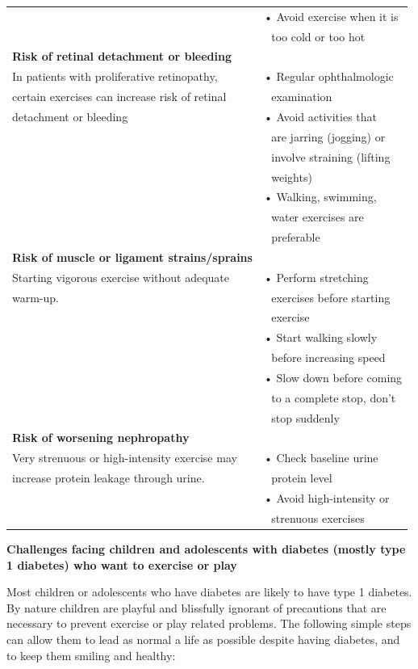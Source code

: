 {\begin{longtable}{|l|l|}
 & • Avoid exercise when it is\\
 & \,\, too cold or too hot\\
\hline
\textbf{Risk of retinal detachment\index{Retinal detachment} or bleeding} & \\
In patients with proliferative retinopathy, & • Regular ophthalmologic\\
certain exercises can increase risk of retinal & \,\, examination\\
detachment or bleeding & • Avoid activities that\\
 & \,\, are jarring (jogging) or\\
 & \,\, involve straining (lifting\\
 & \,\, weights)\\
 & • Walking, swimming,\\
 & \,\, water exercises are\\
 & \,\, preferable\\
\hline
\textbf{Risk of muscle or ligament strains/sprains} & \\
Starting vigorous exercise without adequate & • Perform stretching\\
warm-up. & \,\, exercises before starting\\
 & \,\, exercise\\
 & • Start walking slowly\\
 & \,\, before increasing speed\\
 & • Slow down before coming\\
 & \,\, to a complete stop, don’t\\
 & \,\, stop suddenly\\
\hline
\textbf{Risk of worsening nephropathy\index{Nephropathy}} & \\
Very strenuous or high-intensity exercise may & • Check baseline urine\\
increase protein leakage through urine. & \,\, protein level\\
 & • Avoid high-intensity or\\
 & \,\, strenuous exercises\\
\hline
\end{longtable}
}\relax

\noindent\textbf{Challenges facing children and adolescents with diabetes (mostly type 1 diabetes) who want to exercise or play}

Most children or adolescents who have diabetes are likely to have type 1 diabetes. By nature children are playful and blissfully ignorant of precautions that are necessary to prevent exercise or play related problems. The following simple steps can allow them to lead as normal a life as possible despite having diabetes, and to keep them smiling and healthy:

